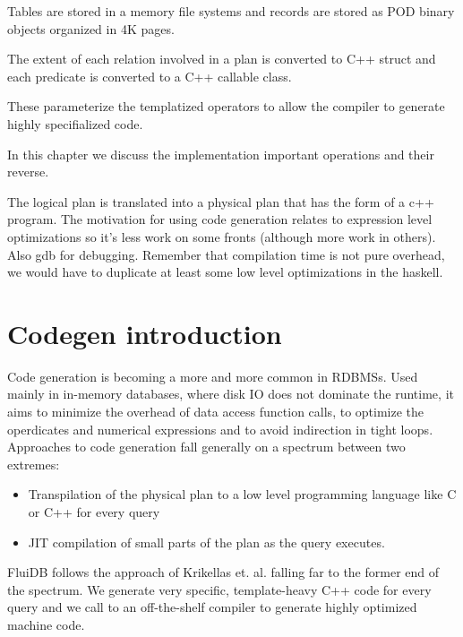 
\begin{summary}
\item Tables are stored in a memory file systems and records are
  stored as POD binary objects organized in 4K pages.
\item The extent of each relation involved in a plan is converted to
  C++ struct and each predicate is converted to a C++ callable
  class.
\item These parameterize the templatized operators to allow the
  compiler to generate highly specifialized code.
\item In this chapter we discuss the implementation important
  operations and their reverse.
\end{summary}

The logical plan is translated into a physical plan that has the form
of a c++ program. The motivation for using code generation relates to
expression level optimizations so it’s less work on some fronts
(although more work in others). Also gdb for debugging. Remember that
compilation time is not pure overhead, we would have to duplicate at
least some low level optimizations in the haskell.

\section{Codegen introduction}

Code generation is becoming a more and more common in RDBMSs. Used
mainly in in-memory databases, where disk IO does not dominate the
runtime, it aims to minimize the overhead of data access function
calls, to optimize the operdicates and numerical expressions and to
avoid indirection in tight loops. Approaches to code generation fall
generally on a spectrum between two extremes:

\begin{itemize}
\item Transpilation of the physical plan to a low level programming
  language like C or C++ for every query
\item JIT compilation of small parts of the plan as the query
  executes.
\end{itemize}

FluiDB follows the approach of Krikellas
et. al. \cite{krikellasGeneratingCodeHolistic2010} falling far to the
former end of the spectrum. We generate very specific, template-heavy
C++ code for every query and we call to an off-the-shelf compiler to
generate highly optimized machine code.

